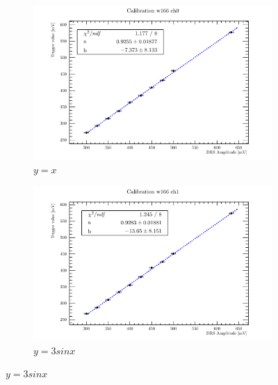 \begin{figure}
    \centering
    \begin{subfigure}[b]{0.15\textwidth}
        \centering
        \includegraphics[width=\textwidth]{figures/ch0.pdf}
        \caption{$y=x$}
        \label{fig:y equals x}
    \end{subfigure}
    \hfill
    \begin{subfigure}[b]{0.15\textwidth}
        \centering
        \includegraphics[width=\textwidth]{figures/ch1.pdf}
        \caption{$y=3sinx$}
        \label{fig:three sin x}
    \end{subfigure}
\end{figure}







